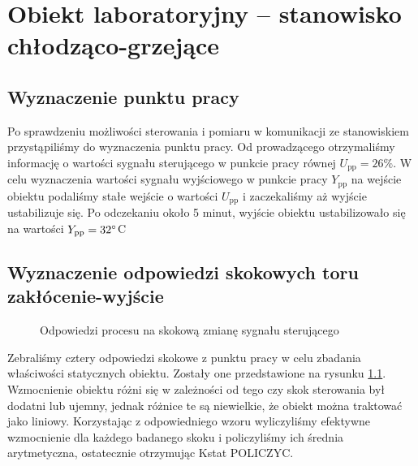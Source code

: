 \chapter{Obiekt laboratoryjny -- stanowisko chłodząco-grzejące}
\label{lab1}

\section{Wyznaczenie punktu pracy}
\label{lab1_punkt_pracy}

Po sprawdzeniu możliwości sterowania i pomiaru w komunikacji ze stanowiskiem przystąpiliśmy do wyznaczenia punktu pracy.
Od prowadzącego otrzymaliśmy informację o wartości sygnału sterującego w punkcie pracy 
równej $U_{\mathrm{pp}} = 26\%$. W celu wyznaczenia wartości sygnału wyjściowego w 
punkcie pracy $Y_{\mathrm{pp}}$ na wejście obiektu podaliśmy stałe wejście o wartości 
$U_{\mathrm{pp}}$ i zaczekaliśmy aż wyjście ustabilizuje się. Po odczekaniu około 5 minut,
wyjście obiektu ustabilizowało się na wartości $Y_{\mathrm{pp}} = \num{32} \degree $C


\section{Wyznaczenie odpowiedzi skokowych toru zakłócenie-wyjście}
\label{lab1_odpowiedzi}

\begin{figure}[b]
    \centering
    \caption{Odpowiedzi procesu na skokową zmianę sygnału sterującego}
    \label{zad2_porow_odp_skok_lab}
\end{figure}
\FloatBarrier

Zebraliśmy cztery odpowiedzi
skokowe z punktu pracy w celu zbadania właściwości statycznych obiektu. Zostały one przedstawione na rysunku \ref{zad2_porow_odp_skok_lab}. Wzmocnienie obiektu różni się w zależności od tego czy skok sterowania był dodatni lub ujemny, jednak różnice te są niewielkie, że obiekt można traktować
jako liniowy. Korzystając z odpowiedniego  wzoru wyliczyliśmy efektywne wzmocnienie dla każdego badanego skoku i policzyliśmy ich średnia arytmetyczna, ostatecznie
otrzymując Kstat POLICZYC.